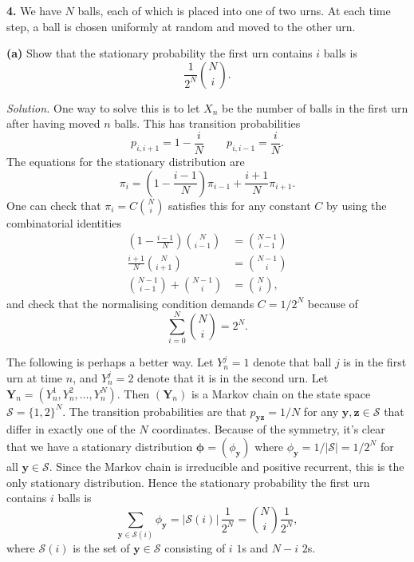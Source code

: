 \documentclass[
  a4paper,
]{article}
\theoremstyle{definition}
\theoremstyle{definition}
\theoremstyle{definition}
\theoremstyle{remark}
\begin{document}
\textbf{4.} We have \(N\) balls, each of which is placed into one of two urns. At each time step, a ball is chosen uniformly at random and moved to the other urn.

\textbf{(a)} Show that the stationary probability the first urn contains \(i\) balls is
\[ \frac{1}{2^N} \binom{N}{i} . \]

\begin{myanswers}

\emph{Solution.} One way to solve this is to let \(X_n\) be the number of balls in the first urn after having moved \(n\) balls. This has transition probabilities
\[ p_{i,i+1} = 1 - \frac{i}{N} \qquad p_{i,i-1} = \frac{i}{N} . \]
The equations for the stationary distribution are
\[ \pi_i = \left(1 - \frac{i-1}{N}\right)\pi_{i-1} + \frac{i+1}N \pi_{i+1} . \]
One can check that \(\pi_i = C \binom{N}{i}\) satisfies this for any constant \(C\) by using the combinatorial identities
\begin{align*}
\left(1 - \frac{i-1}{N}\right)\binom{N}{i-1} &= \binom{N-1}{i-1} \\
\frac{i+1}N \binom{N}{i+1} &= \binom{N-1}{i} \\
\binom{N-1}{i-1} + \binom{N-1}{i} &= \binom Ni ,
\end{align*}
and check that the normalising condition demands \(C = 1/2^N\) because of
\[ \sum_{i=0}^N \binom Ni = 2^N . \]

The following is perhaps a better way. Let \(Y_n^j = 1\) denote that ball \(j\) is in the first urn at time \(n\), and \(Y_n^j = 2\) denote that it is in the second urn. Let \(\mathbf Y_n = (Y_n^1, Y_n^2, \dots, Y_n^N)\). Then \((\mathbf Y_n)\) is a Markov chain on the state space \(\mathcal S = \{1,2\}^N\). The transition probabilities are that \(p_{\mathbf{yz}} = 1/N\) for any \(\mathbf y, \mathbf z \in \mathcal S\) that differ in exactly one of the \(N\) coordinates. Because of the symmetry, it's clear that we have a stationary distribution \(\boldsymbol\phi = (\phi_{\mathbf y})\) where \(\phi_{\mathbf y} = 1/|\mathcal S| = 1/2^N\) for all \(\mathbf y \in \mathcal S\). Since the Markov chain is irreducible and positive recurrent, this is the only stationary distribution. Hence the stationary probability the first urn contains \(i\) balls is
\[ \sum_{\mathbf y \in \mathcal S(i)} \phi_{\mathbf y}  = \big|\mathcal S(i)\big|\, \frac{1}{2^N} = \binom{N}{i} \frac 1{2^N} , \]
where \(\mathcal S(i)\) is the set of \(\mathbf y \in \mathcal S\) consisting of \(i\) \(1\)s and \(N-i\) \(2\)s.

\end{myanswers}
\end{document}
